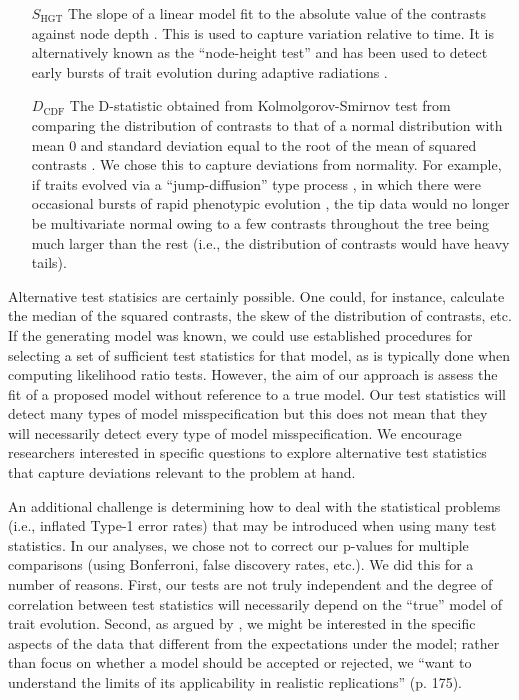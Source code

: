\begin{enumerate}
\item[$S_{\text{HGT}}$] The slope of a linear model fit to the absolute value of the contrasts against node depth \citep[after][]{Purvis1995}. This is used to capture variation relative to time. It is alternatively known as the ``node-height test'' and has been used to detect early bursts of trait evolution during adaptive radiations \citep[see][for uses and modifications of this test]{FreckletonHarvey2006, SlaterPennell}. 

\item[$D_{\text{CDF}}$] The D-statistic obtained from Kolmolgorov-Smirnov test from comparing the distribution of contrasts to that of a normal distribution with mean $0$ and standard deviation equal to the root of the mean of squared contrasts \citep[the expected distribution of the contrasts under BM; see][]{Felsenstein1985, Rohlf2001}. We chose this to capture deviations from normality. For example, if traits evolved via a ``jump-diffusion'' type process \citep{Landis2012}, in which there were occasional bursts of rapid phenotypic evolution \citep{PennellPE}, the tip data would no longer be multivariate normal owing to a few contrasts throughout the tree being much larger than the rest (i.e., the distribution of contrasts would have heavy tails). 

\end{enumerate}

Alternative test statisics are certainly possible. One could, for instance, calculate the median of the squared contrasts, the skew of the distribution of contrasts, etc. If the generating model was known, we could use established procedures for selecting a set of sufficient \citep[or, approximately sufficient;][]{MajoramJoyce} test statistics for that model, as is typically done when computing likelihood ratio tests. However, the aim of our approach is assess the fit of a proposed model without reference to a true model. Our test statistics will detect many types of model misspecification but this does not mean that they will necessarily detect every type of model misspecification. We encourage researchers interested in specific questions to explore alternative test statistics that capture deviations relevant to the problem at hand. 

An additional challenge is determining how to deal with the statistical problems (i.e., inflated Type-1 error rates) that may be introduced when using many test statistics. In our analyses, we chose not to correct our p-values for multiple comparisons (using Bonferroni, false discovery rates, etc.). We did this for a number of reasons. First, our tests are not truly independent and the degree of correlation between test statistics will necessarily depend on the ``true'' model of trait evolution.  Second, as argued by \citet{Gelman2006}, we might be interested in the specific aspects of the data that different from the expectations under the model; rather than focus on whether a model should be accepted or rejected, we ``want to understand the limits of its applicability in realistic replications'' (p. 175). 

